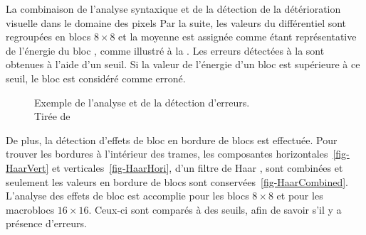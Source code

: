 \begin{section}{La combinaison de l'analyse syntaxique et de la
détection de la détérioration visuelle dans le domaine des pixels}
Par la suite, les valeurs du différentiel sont regroupées en blocs $8 \times 8$
et la moyenne est assignée comme étant représentative de l'énergie du bloc
\citep[p.~27-28]{Ikuno2007}, comme illustré à la .
Les erreurs détectées à la  sont obtenues à l'aide d'un
seuil. Si la valeur de l'énergie d'un bloc est supérieure à ce seuil, le
bloc est considéré comme erroné.

\begin{figure}
	\caption[Exemple de l'analyse et de la détection d'erreurs]{Exemple de l'analyse et de la détection d'erreurs.
\\Tirée de \citet[p.~25]{Ikuno2007}}
	\label{fig-FrameDiff}
\end{figure}

De plus, la détection d'effets de bloc en bordure de blocs est effectuée. Pour
trouver les bordures à l'intérieur des trames, les composantes
horizontales~\ref{fig-HaarVert} et verticales~\ref{fig-HaarHori}, d'un filtre de
Haar \citep{Haar1911}, sont combinées et seulement les valeurs en bordure de
blocs sont conservées~\ref{fig-HaarCombined}. L'analyse des effets de bloc est
accomplie pour les blocs $8 \times 8$ et pour les macroblocs $16 \times 16$.
Ceux-ci sont comparés à des seuils, afin de savoir s'il y a présence d'erreurs.


\end{section}
